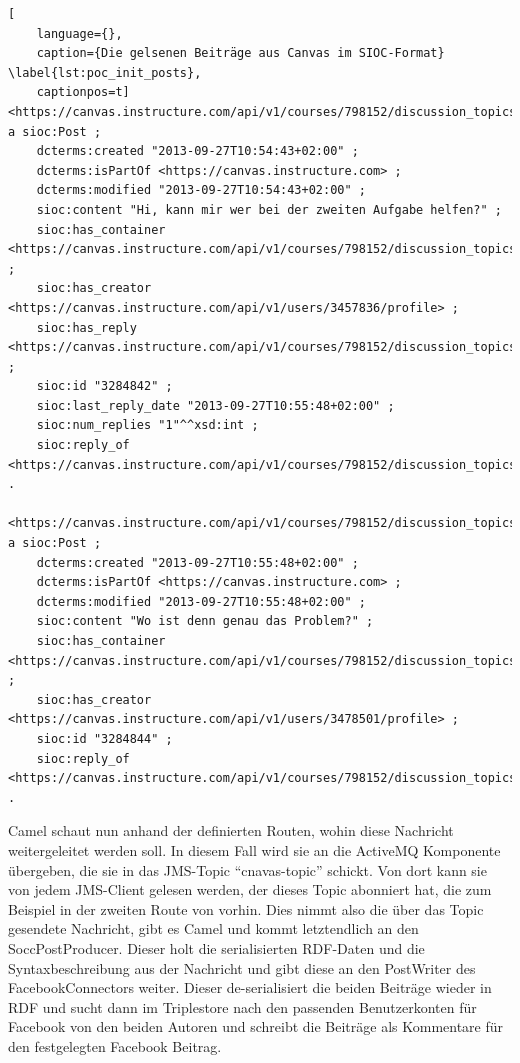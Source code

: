 \begin{lstlisting}[
    language={},
    caption={Die gelsenen Beiträge aus Canvas im SIOC-Format} \label{lst:poc_init_posts},
    captionpos=t]
<https://canvas.instructure.com/api/v1/courses/798152/discussion_topics/1540697/entries/3284842> a sioc:Post ;
    dcterms:created "2013-09-27T10:54:43+02:00" ;
    dcterms:isPartOf <https://canvas.instructure.com> ;
    dcterms:modified "2013-09-27T10:54:43+02:00" ;
    sioc:content "Hi, kann mir wer bei der zweiten Aufgabe helfen?" ;
    sioc:has_container <https://canvas.instructure.com/api/v1/courses/798152/discussion_topics/1540697> ;
    sioc:has_creator <https://canvas.instructure.com/api/v1/users/3457836/profile> ;
    sioc:has_reply <https://canvas.instructure.com/api/v1/courses/798152/discussion_topics/1540697/entries/3284844> ;
    sioc:id "3284842" ;
    sioc:last_reply_date "2013-09-27T10:55:48+02:00" ;
    sioc:num_replies "1"^^xsd:int ;
    sioc:reply_of <https://canvas.instructure.com/api/v1/courses/798152/discussion_topics/1540697#discussion_topic> .

<https://canvas.instructure.com/api/v1/courses/798152/discussion_topics/1540697/entries/3284844> a sioc:Post ;
    dcterms:created "2013-09-27T10:55:48+02:00" ;
    dcterms:isPartOf <https://canvas.instructure.com> ;
    dcterms:modified "2013-09-27T10:55:48+02:00" ;
    sioc:content "Wo ist denn genau das Problem?" ;
    sioc:has_container <https://canvas.instructure.com/api/v1/courses/798152/discussion_topics/1540697> ;
    sioc:has_creator <https://canvas.instructure.com/api/v1/users/3478501/profile> ;
    sioc:id "3284844" ;
    sioc:reply_of <https://canvas.instructure.com/api/v1/courses/798152/discussion_topics/1540697/entries/3284842> .
\end{lstlisting}

Camel schaut nun anhand der definierten Routen, wohin diese Nachricht weitergeleitet werden soll. In diesem Fall wird sie an die ActiveMQ Komponente übergeben, die sie in das JMS-Topic \enquote{cnavas-topic} schickt. Von dort kann sie von jedem JMS-Client gelesen werden, der dieses Topic abonniert hat, die zum Beispiel in der zweiten Route von vorhin. Dies nimmt also die über das Topic gesendete Nachricht, gibt es Camel und kommt letztendlich an den SoccPostProducer. Dieser holt die serialisierten RDF-Daten und die Syntaxbeschreibung aus der Nachricht und gibt diese an den PostWriter des FacebookConnectors weiter. Dieser de-serialisiert die beiden Beiträge wieder in RDF und sucht dann im Triplestore nach den passenden Benutzerkonten für Facebook von den beiden Autoren und schreibt die Beiträge als Kommentare für den festgelegten Facebook Beitrag.

